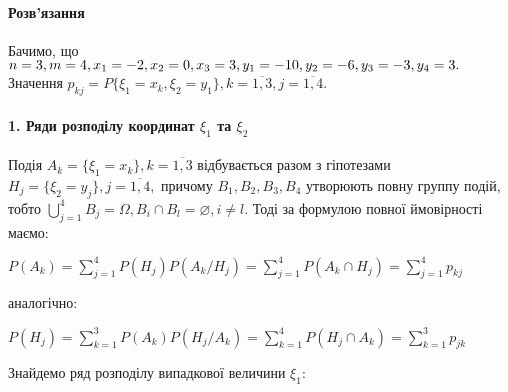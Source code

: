 \documentclass[a4paper, 20pt, titlepage]{article}
\begin{document}
\paragraph{Розв'язання}


\begin{comment}
\begin{flushright}
\begin{tikzpicture}
\begin{axis}[
	axis lines = middle,
	xmin = - 5 , xmax = 5,
	ymin = -5, ymax = 5,
	xtick = {0},
	ytick = \empty,
	scale = 1.2,
	xlabel style={below right},
	xlabel = {$x$},
	ylabel = {$y$}
]
\addplot[domain = -4:4, samples = 100, color = red]{4 };
\end{axis}
\end{tikzpicture}
\end{flushright}
\end{comment}


\hfill \break

\begin{spacing}{1.4}
Бачимо, що $n=3, m  = 4, x_1 = -2, x_2 = 0, x_3 = 3, y_1 = -10, y_2 =  -6, \newline y_3 = -3, y_4 = 3.$ 
Значення $p_{kj} = P\{\xi_1 = x_k, \xi_2 = y_1\}, k = \overline{1,3}, j = \overline{1,4}.$  

\paragraph{1. Ряди розподілу координат $\xi_1$ та $\xi_2$}
\hfill \break

Подія $A_k = \{\xi_1 = x_k\},  k = \overline{1,3} $ відбувається разом з гіпотезами $H_j = \{\xi_2 = y_j\},  j = \overline{1,4},$ причому 
$B_1,B_2,B_3,B_4$ утворюють повну группу подій, тобто $\bigcup_{j = 1}^{4} B_j = \Omega, B_i \cap B_l = \varnothing, i \neq l.$ 
Тоді за формулою повної ймовірності маємо:
\begin{center}
$P(A_k) = \sum\limits_{j=1}^4 P(H_j) P(A_k/H_j) = \sum\limits_{j=1}^4 P(A_k \cap H_j) = \sum\limits_{j=1}^4 p_{kj} $
\end{center}

аналогічно:


\begin{center}
$P(H_j) = \sum\limits_{k=1}^3 P(A_k) P(H_j/A_k) = \sum\limits_{k=1}^4 P(H_j \cap A_k) = \sum\limits_{k=1}^3 p_{jk}$
\end{center}

\vspace{3mm}
\hspace{-6mm} Знайдемо ряд розподілу випадкової величини $\xi_1:$
\end{spacing}
\end{document}
